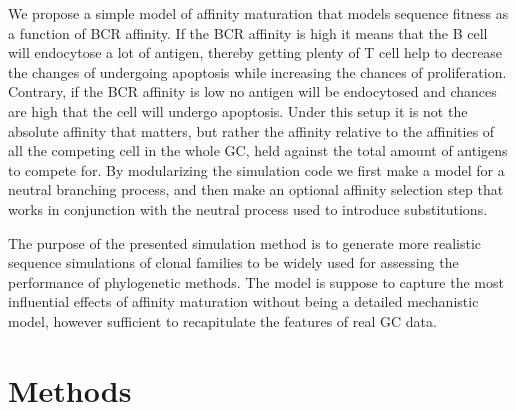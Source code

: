 We propose a simple model of affinity maturation that models sequence fitness as a function of BCR affinity.
If the BCR affinity is high it means that the B cell will endocytose a lot of antigen, thereby getting plenty of T cell help to decrease the changes of undergoing apoptosis while increasing the chances of proliferation.
Contrary, if the BCR affinity is low no antigen will be endocytosed and chances are high that the cell will undergo apoptosis.
Under this setup it is not the absolute affinity that matters, but rather the affinity relative to the affinities of all the competing cell in the whole GC, held against the total amount of antigens to compete for.
By modularizing the simulation code we first make a model for a neutral branching process, and then make an optional affinity selection step that works in conjunction with the neutral process used to introduce substitutions.

The purpose of the presented simulation method is to generate more realistic sequence simulations of clonal families to be widely used for assessing the performance of phylogenetic methods.
The model is suppose to capture the most influential effects of affinity maturation without being a detailed mechanistic model, however sufficient to recapitulate the features of real GC data.






\section{Methods}

